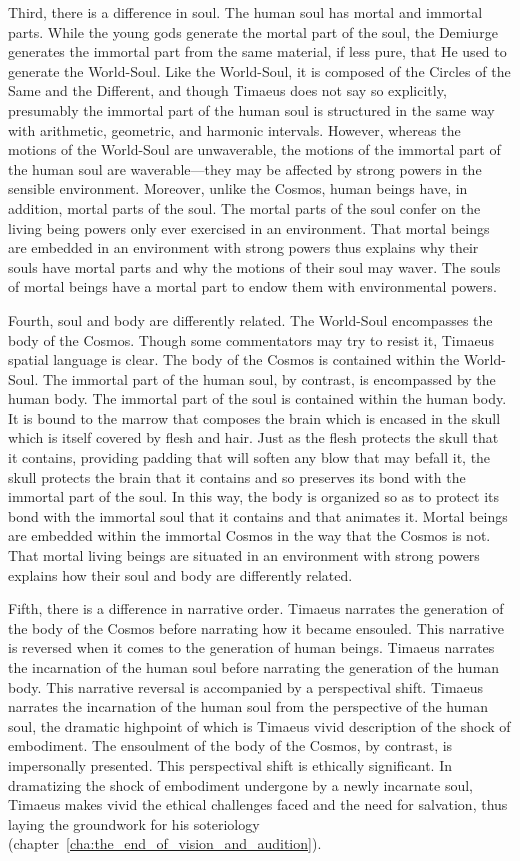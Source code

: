Third, there is a difference in soul. The human soul has mortal and immortal parts. While the young gods generate the mortal part of the soul, the Demiurge generates the immortal part from the same material, if less pure, that He used to generate the World-Soul. Like the World-Soul, it is composed of the Circles of the Same and the Different, and though Timaeus does not say so explicitly, presumably the immortal part of the human soul is structured in the same way with arithmetic, geometric, and harmonic intervals. However, whereas the motions of the World-Soul are unwaverable, the motions of the immortal part of the human soul are waverable---they may be affected by strong powers in the sensible environment. Moreover, unlike the Cosmos, human beings have, in addition, mortal parts of the soul. The mortal parts of the soul confer on the living being powers only ever exercised in an environment. That mortal beings are embedded in an environment with strong powers thus explains why their souls have mortal parts and why the motions of their soul may waver. The souls of mortal beings have a mortal part to endow them with environmental powers.

Fourth, soul and body are differently related. The World-Soul encompasses the body of the Cosmos. Though some commentators may try to resist it, Timaeus spatial language is clear. The body of the Cosmos is contained within the World-Soul. The immortal part of the human soul, by contrast, is encompassed by the human body. The immortal part of the soul is contained within the human body. It is bound to the marrow that composes the brain which is encased in the skull which is itself covered by flesh and hair. Just as the flesh protects the skull that it contains, providing padding that will soften any blow that may befall it, the skull protects the brain that it contains and so preserves its bond with the immortal part of the soul. In this way, the body is organized so as to protect its bond with the immortal soul that it contains and that animates it. Mortal beings are embedded within the immortal Cosmos in the way that the Cosmos is not. That mortal living beings are situated in an environment with strong powers explains how their soul and body are differently related.

Fifth, there is a difference in narrative order. Timaeus narrates the generation of the body of the Cosmos before narrating how it became ensouled. This narrative is reversed when it comes to the generation of human beings. Timaeus narrates the incarnation of the human soul before narrating the generation of the human body. This narrative reversal is accompanied by a perspectival shift. Timaeus narrates the incarnation of the human soul from the perspective of the human soul, the dramatic highpoint of which is Timaeus vivid description of the shock of embodiment. The ensoulment of the body of the Cosmos, by contrast, is impersonally presented. This perspectival shift is ethically significant. In dramatizing the shock of embodiment undergone by a newly incarnate soul, Timaeus makes vivid the ethical challenges faced and the need for salvation, thus laying the groundwork for his soteriology (chapter~\ref{cha:the_end_of_vision_and_audition}).

